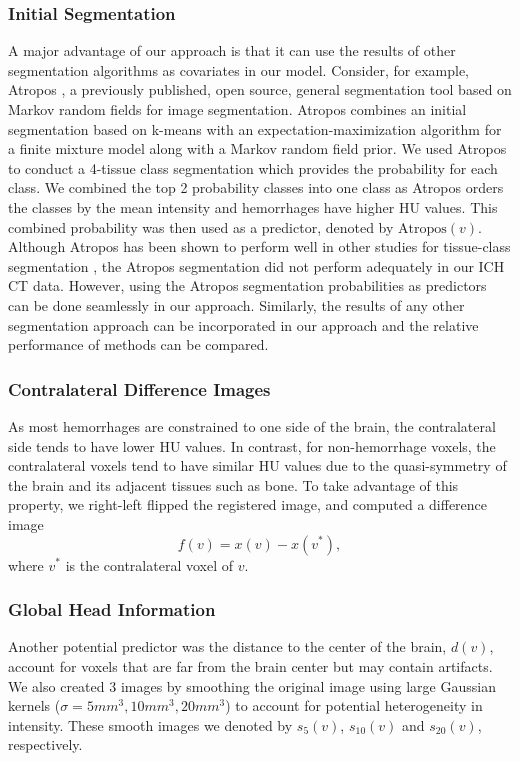 \documentclass{elsarticle_nonatbib}\usepackage[]{graphicx}\usepackage[]{color}
\begin{document}
\subsubsection{Initial Segmentation} A major advantage of our approach is that it can use the results of other segmentation algorithms as covariates in our model. Consider, for example, Atropos \citep{atropos}, a previously published, open source, general segmentation tool based on Markov random fields for image segmentation.  Atropos combines an initial segmentation based on k-means with an expectation-maximization algorithm for a finite mixture model along with a Markov random field prior.  We used Atropos to conduct a 4-tissue class segmentation which provides the probability for each class.  We combined the top 2 probability classes into one class as Atropos orders the classes by the mean intensity and hemorrhages have higher HU values.  This combined probability was then used as a predictor, denoted by $\text{Atropos}(v)$.  Although Atropos has been shown to perform well in other studies for tissue-class segmentation \citep{atropos, menze2015multimodal}, the Atropos segmentation did not perform adequately in our ICH CT data. However, using the Atropos segmentation probabilities as predictors can be done seamlessly in our approach. Similarly, the results of any other segmentation approach can be incorporated in our approach and the relative performance of methods can be compared.


\subsubsection{Contralateral Difference Images}  As most hemorrhages are constrained to one side of the brain, the contralateral side tends to have lower HU values.  In contrast, for non-hemorrhage voxels, the contralateral voxels tend to have similar HU values due to the quasi-symmetry of the brain and its adjacent tissues such as bone. To take advantage of this property, we right-left flipped the registered image, and computed a difference image
\begin{equation}
f(v) = x(v) - x(v^{*}), \label{eq:flip}
\end{equation}
where $v^{*}$ is the contralateral voxel of $v$.



\subsubsection{Global Head Information} Another potential predictor was the distance to the center of the brain, $d(v)$, account for voxels that are far from the brain center but may contain artifacts.  We also created $3$ images by smoothing the original image using large Gaussian kernels ($\sigma = 5mm^3, 10mm^3, 20mm^3$) to account for potential heterogeneity in intensity. These smooth images we denoted by $s_{5}(v)$, $s_{10}(v)$ and $s_{20}(v)$, respectively.
\end{document}
